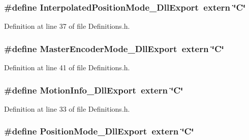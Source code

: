 \subsubsection[{\-Interpolated\-Position\-Mode\-\_\-\-Dll\-Export}]{\setlength{\rightskip}{0pt plus 5cm}\#define {\bf \-Interpolated\-Position\-Mode\-\_\-\-Dll\-Export}~extern \char`\"{}\-C\char`\"{}}\label{Definitions_8h_ac5966fa4eb0d01b02409bff27b3f5304}


\-Definition at line 37 of file \-Definitions.\-h.

\subsubsection[{\-Master\-Encoder\-Mode\-\_\-\-Dll\-Export}]{\setlength{\rightskip}{0pt plus 5cm}\#define {\bf \-Master\-Encoder\-Mode\-\_\-\-Dll\-Export}~extern \char`\"{}\-C\char`\"{}}\label{Definitions_8h_a9fb1a81b5c38978644e19592f51b9199}


\-Definition at line 41 of file \-Definitions.\-h.

\subsubsection[{\-Motion\-Info\-\_\-\-Dll\-Export}]{\setlength{\rightskip}{0pt plus 5cm}\#define {\bf \-Motion\-Info\-\_\-\-Dll\-Export}~extern \char`\"{}\-C\char`\"{}}\label{Definitions_8h_aae35f3816f56412dce96fdca2452bfdf}


\-Definition at line 33 of file \-Definitions.\-h.

\subsubsection[{\-Position\-Mode\-\_\-\-Dll\-Export}]{\setlength{\rightskip}{0pt plus 5cm}\#define {\bf \-Position\-Mode\-\_\-\-Dll\-Export}~extern \char`\"{}\-C\char`\"{}}\label{Definitions_8h_aa48c0187dfe516fe36916ff52b2051dc}



